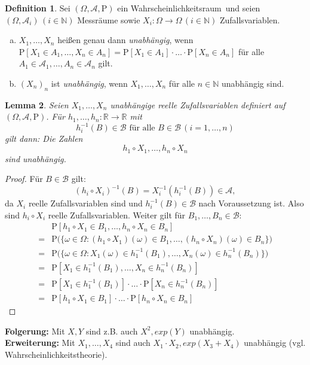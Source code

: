 \documentclass[a4paper,12pt,fleqn]{scrartcl}
\newcommand{\N}{\mathbb{N}}
\newcommand{\R}{\mathbb{R}}
\newcommand{\m}[1]{\mathcal{ #1 }}
\newcommand{\p}[1]{\text{P(} #1 \text{)}}
\newcommand{\WR}{Wahrscheinlichkeitsraum}
\theoremstyle{definition}
\newtheorem{definition}{Definition}[section]
\theoremstyle{plain}
\newtheorem{lemma}[definition]{Lemma}
\theoremstyle{remark}
\begin{document}
\begin{definition}
Sei $(\Omega, \m{A}, \text{P})$ ein \WR \, und seien $(\Omega, \m{A}_i) \, (i \in \N)$ Messräume sowie $X_i: \Omega \rightarrow  \Omega \, (i \in \N)$ Zufallsvariablen.
\begin{enumerate}[a)]
\item $X_1, \ldots , X_n$ heißen genau dann \emph{unabhängig}, wenn $\text{P}[X_1 \in A_1, \ldots , X_n \in A_n] = \text{P}[X_1 \in A_1] \cdot \ldots \cdot \text{P}[X_n \in A_n]$ für alle $A_1 \in \m{A}_1, \ldots , A_n \in \m{A}_n$ gilt.
\item $(X_n)_n$ ist \emph{unabhängig}, wenn $X_1, \ldots , X_n$ für alle $n \in \N$ unabhängig sind.
\end{enumerate}
\end{definition}
\begin{lemma}
Seien $X_1, \ldots , X_n$ unabhängige reelle Zufallsvariablen definiert auf $(\Omega, \m{A}, \text{P})$. Für $h_1, \ldots , h_n : \R \rightarrow \R$ mit
\[h_i^{-1}(B) \in \m{B} \text{ für alle } B \in \m{B} \, (i=1, \ldots , n)\]
gilt dann: Die Zahlen
\[h_1 \circ X_1, \ldots , h_n \circ X_n\]
sind unabhängig.
\end{lemma}
\begin{proof}
Für $B \in \m{B}$ gilt:
\[(h_i \circ X_i)^{-1}(B) = X_i^{-1}(h_i^{-1}(B)) \in \m{A},\]
da $X_i$ reelle Zufallsvariablen sind und $h_i^{-1}(B) \in \m{B}$ nach Voraussetzung ist. Also sind $h_i \circ X_i$ reelle Zufallsvariablen. Weiter gilt für $B_1, \ldots , B_n \in \m{B}$:
\begin{align*}
&\text{P}[h_1 \circ X_1 \in B_1, \ldots , h_n \circ X_n \in B_n] \\
=&\p{\{\omega \in \Omega : (h_1 \circ X_1)(\omega) \in B_1, \ldots , (h_n \circ X_n)(\omega) \in B_n\}}\\
=&\p{\{\omega \in \Omega : X_1(\omega) \in h_1^{-1}(B_1), \ldots ,X_n(\omega) \in h_n^{-1}(B_n)\}}\\
=&\text{P}[X_1 \in h_1^{-1}(B_1), \ldots, X_n \in h_n^{-1}(B_n)]\\
=&\text{P}[X_1 \in h_1^{-1}(B_1)] \cdot \ldots \cdot \text{P}[X_n \in h_n^{-1}(B_n)]\\
=&\text{P}[h_1 \circ X_1 \in B_1] \cdot \ldots \cdot \text{P}[h_n \circ X_n \in B_n]
\end{align*}
\end{proof}

\textbf{Folgerung:} Mit $X, Y$ sind z.B. auch $X^2, exp(Y)$ unabhängig.\\
\textbf{Erweiterung:} Mit $X_1, \ldots , X_4$ sind auch $X_1 \cdot X_2, exp(X_3 + X_4)$ unabhängig (vgl. Wahrscheinlichkeitstheorie).
\end{document}
